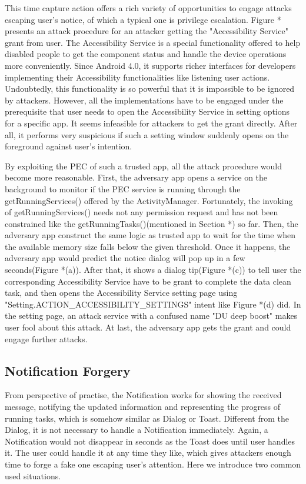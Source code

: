 \documentclass{sig-alternate-05-2015}
\begin{document}
This time capture action offers a rich variety of opportunities to engage attacks escaping user's notice, of which a typical one is privilege escalation. Figure * presents an attack procedure for an attacker getting the "Accessibility Service" grant from user. The Accessibility Service is a special functionality offered to help disabled people to get the component status and handle the device operations more conveniently. Since Android 4.0, it supports richer interfaces for developers implementing their Accessibility functionalities like listening user actions. Undoubtedly, this functionality is so powerful that it is impossible to be ignored by attackers. However, all the implementations have to be engaged under the prerequisite that user needs to open the Accessibility Service in setting options for a specific app. It seems infeasible for attackers to get the grant directly. After all, it performs very suspicious if such a setting window suddenly opens on the foreground against user's intention.

By exploiting the PEC of such a trusted app, all the attack procedure would become more reasonable. First, the adversary app opens a service on the background to monitor if the PEC service is running through the getRunningServices() offered by the ActivityManager. Fortunately, the invoking of getRunningServices() needs not any permission request and has not been constrained like the getRunningTasks()(mentioned in Section *) so far. Then, the adversary app construct the same logic as trusted app to wait for the time when the available memory size falls below the given threshold. Once it happens, the adversary app would predict the notice dialog will pop up in a few seconds(Figure *(a)). After that, it shows a dialog tip(Figure *(c)) to tell user the corresponding Accessibility Service have to be grant to complete the data clean task, and then opens the Accessibility Service setting page using "Setting.ACTION\_ACCESSIBILITY\_SETTINGS" intent like Figure *(d) did. In the setting page, an attack service with a confused name "DU deep boost" makes user fool about this attack. At last, the adversary app gets the grant and could engage further attacks. 


\subsection{Notification Forgery}
From perspective of practise, the Notification works for showing the received message, notifying the updated information and representing the progress of running tasks, which is somehow similar as Dialog or Toast. Different from the Dialog, it is not necessary to handle a Notification immediately. Again, a Notification would not disappear in seconds as the Toast does until user handles it. The user could handle it at any time they like, which gives attackers enough time to forge a fake one escaping user's attention. Here we introduce two common used situations. 
\end{document}
